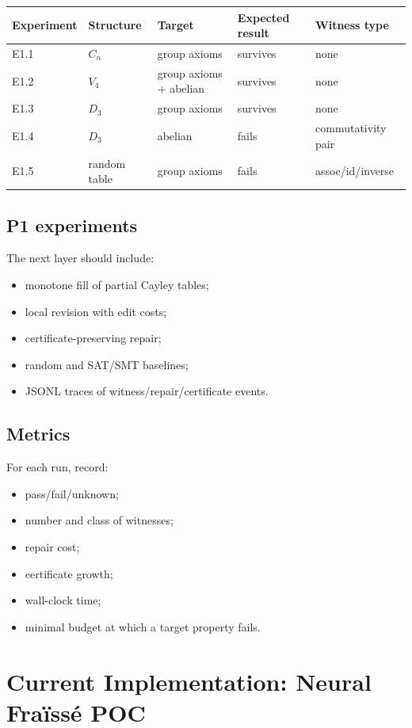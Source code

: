 \documentclass[11pt]{article}
\begin{document}
\begin{center}
\begin{tabular}{lllll}
\toprule
Experiment & Structure & Target & Expected result & Witness type \\
\midrule
E1.1 & \(C_n\) & group axioms & survives & none \\
E1.2 & \(V_4\) & group axioms + abelian & survives & none \\
E1.3 & \(D_3\) & group axioms & survives & none \\
E1.4 & \(D_3\) & abelian & fails & commutativity pair \\
E1.5 & random table & group axioms & fails & assoc/id/inverse \\
\bottomrule
\end{tabular}
\end{center}

\subsection{P1 experiments}

The next layer should include:
\begin{itemize}[leftmargin=2em]
  \item monotone fill of partial Cayley tables;
  \item local revision with edit costs;
  \item certificate-preserving repair;
  \item random and SAT/SMT baselines;
  \item JSONL traces of witness/repair/certificate events.
\end{itemize}

\subsection{Metrics}

For each run, record:
\begin{itemize}[leftmargin=2em]
  \item pass/fail/unknown;
  \item number and class of witnesses;
  \item repair cost;
  \item certificate growth;
  \item wall-clock time;
  \item minimal budget at which a target property fails.
\end{itemize}

\section{Current Implementation: Neural Fra\"iss\'e POC}\label{sec:nf}
\end{document}
